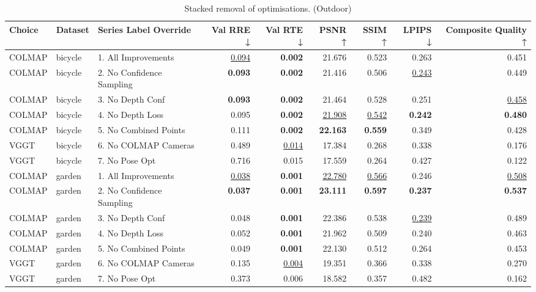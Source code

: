 \begin{table}[H]
\caption{\ifdefined\customcaption \customcaption \else Stacked removal of optimisations. (Outdoor) \fi}
\label{tab:99_all_improvements_stacked_outdoor}
\centering
\scriptsize
\begin{tabular}{lllrrrrrr}
\toprule
Choice & Dataset & Series Label Override & Val RRE ↓ & Val RTE ↓ & PSNR ↑ & SSIM ↑ & LPIPS ↓ & Composite Quality ↑ \\
\midrule
COLMAP & bicycle & 1. All Improvements & \underline{0.094} & \textbf{0.002} & 21.676 & 0.523 & 0.263 & 0.451 \\
COLMAP & bicycle & 2. No Confidence Sampling & \textbf{0.093} & \textbf{0.002} & 21.416 & 0.506 & \underline{0.243} & 0.449 \\
COLMAP & bicycle & 3. No Depth Conf & \textbf{0.093} & \textbf{0.002} & 21.464 & 0.528 & 0.251 & \underline{0.458} \\
COLMAP & bicycle & 4. No Depth Loss & 0.095 & \textbf{0.002} & \underline{21.908} & \underline{0.542} & \textbf{0.242} & \textbf{0.480} \\
COLMAP & bicycle & 5. No Combined Points & 0.111 & \textbf{0.002} & \textbf{22.163} & \textbf{0.559} & 0.349 & 0.428 \\
VGGT & bicycle & 6. No COLMAP Cameras & 0.489 & \underline{0.014} & 17.384 & 0.268 & 0.338 & 0.176 \\
VGGT & bicycle & 7. No Pose Opt & 0.716 & 0.015 & 17.559 & 0.264 & 0.427 & 0.122 \\
\midrule
COLMAP & garden & 1. All Improvements & \underline{0.038} & \textbf{0.001} & \underline{22.780} & \underline{0.566} & 0.246 & \underline{0.508} \\
COLMAP & garden & 2. No Confidence Sampling & \textbf{0.037} & \textbf{0.001} & \textbf{23.111} & \textbf{0.597} & \textbf{0.237} & \textbf{0.537} \\
COLMAP & garden & 3. No Depth Conf & 0.048 & \textbf{0.001} & 22.386 & 0.538 & \underline{0.239} & 0.489 \\
COLMAP & garden & 4. No Depth Loss & 0.052 & \textbf{0.001} & 21.962 & 0.509 & 0.240 & 0.463 \\
COLMAP & garden & 5. No Combined Points & 0.049 & \textbf{0.001} & 22.130 & 0.512 & 0.264 & 0.453 \\
VGGT & garden & 6. No COLMAP Cameras & 0.135 & \underline{0.004} & 19.351 & 0.366 & 0.338 & 0.270 \\
VGGT & garden & 7. No Pose Opt & 0.373 & 0.006 & 18.582 & 0.357 & 0.482 & 0.162 \\

\end{tabular}
\end{table}
